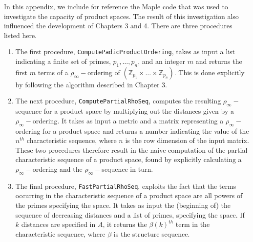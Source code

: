 
In this appendix, we include for reference the Maple code that was used to investigate the capacity of product spaces. The result of this investigation also influenced the development of Chapters 3 and 4. There are three procedures listed here.

\begin{enumerate}
	\item The first procedure, \texttt{ComputePadicProductOrdering}, takes as input a list indicating a finite set of primes, $p_1, 
\ldots, p_n$, and an integer $m$ and returns the first $m$ terms of a $\rho_\infty-$ordering of $(\mathbb{Z}_{p_1} \times \ldots \times \mathbb{Z}_{p_n} )$. This is done explicitly by following the algorithm described in Chapter 3.
	\item The next procedure, \texttt{ComputePartialRhoSeq}, computes the resulting $\rho_\infty-$sequence for a product space by multiplying out the distances given by a $\rho_\infty-$ordering. It takes as input a metric and a matrix representing a $\rho_\infty-$ordering for a product space and returns a number indicating the value of the $n^{th}$ characteristic sequence, where $n$ is the row dimension of the input matrix. These two procedures therefore result in the naive computation of the partial characteristic sequence of a product space, found by explicitly calculating a $\rho_\infty-$ordering and the $\rho_\infty-$sequence in turn.
	
	\item The final procedure, \texttt{FastPartialRhoSeq}, exploits the fact that the terms occurring in the characteristic sequence of a product space are all powers of the primes specifying the space. It takes as input the (beginning of) the sequence of decreasing distances and a list of primes, specifying the space. If $k$ distances are specified in $A$, it returns the $\beta(k)^{th}$ term in the characteristic sequence, where $\beta$ is the structure sequence.
\end{enumerate}

\newpage



\newpage


\newpage

